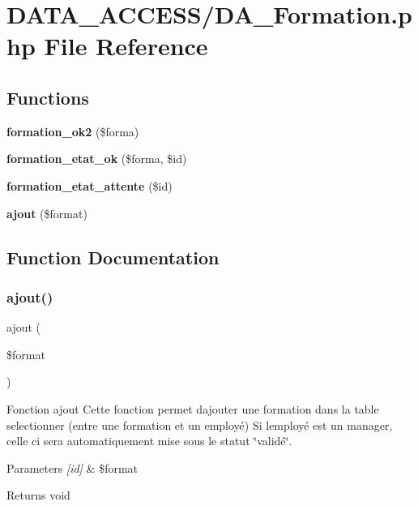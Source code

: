 \section{D\+A\+T\+A\+\_\+\+A\+C\+C\+E\+S\+S/\+D\+A\+\_\+\+Formation.php File Reference}
\label{_d_a___formation_8php}
\subsection*{Functions}
\begin{DoxyCompactItemize}
\item 
\textbf{ formation\+\_\+ok2} (\$forma)
\item 
\textbf{ formation\+\_\+etat\+\_\+ok} (\$forma, \$id)
\item 
\textbf{ formation\+\_\+etat\+\_\+attente} (\$id)
\item 
\textbf{ ajout} (\$format)
\end{DoxyCompactItemize}


\subsection{Function Documentation}
\mbox{\label{_d_a___formation_8php_a216b9e5a309a53fab1da28931d5cd352}} 
\subsubsection{ajout()}
{\footnotesize\ttfamily ajout (\begin{DoxyParamCaption}\item[{}]{\$format }\end{DoxyParamCaption})}

Fonction ajout Cette fonction permet d\textquotesingle{}ajouter une formation dans la table selectionner (entre une formation et un employé) Si l\textquotesingle{}employé est un manager, celle ci sera automatiquement mise sous le statut \char`\"{}validé\char`\"{}. 
\begin{DoxyParams}{Parameters}
{\em \mbox{[}id\mbox{]}} & \$format \\
\hline
\end{DoxyParams}
\begin{DoxyReturn}{Returns}
void 
\end{DoxyReturn}
\mbox{\label{_d_a___formation_8php_a4150fb7fb9a6f85120b497c6d0a2c099}} 
